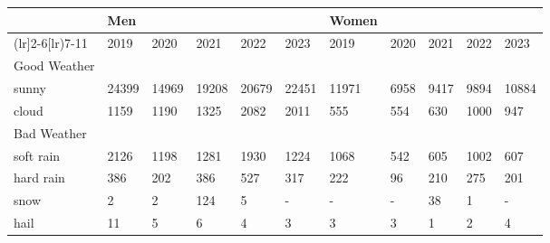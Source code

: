 \begin{tabular}{lllllllllll}
\hline
& Men &  &  &  &  & Women &  &  &  &  \\ \cmidrule(lr]{2-6}\cmidrule[lr){7-11}
& 2019 & 2020 & 2021 & 2022 & 2023 & 2019 & 2020 & 2021 & 2022 & 2023 \\ \hline
Good Weather &&&&&&&&&& \\
sunny & 24399 & 14969 & 19208 & 20679 & 22451 & 11971 & 6958 & 9417 & 9894 & 10884 \\
cloud &  1159 &  1190 &  1325 &  2082 &  2011 &   555 &  554 &  630 & 1000 &   947 \\
Bad Weather &&&&&&&&&& \\
soft rain &  2126 &  1198 &  1281 &  1930 &  1224 &  1068 &  542 &  605 & 1002 &   607 \\
hard rain &   386 &   202 &   386 &   527 &   317 &   222 &   96 &  210 &  275 &   201 \\
snow &     2 &     2 &   124 &     5 & - & - & - &   38 &    1 & - \\
hail &    11 &     5 &     6 &     4 &     3 &     3 &    3 &    1 &    2 &     4 \\
\hline
\end{tabular}
